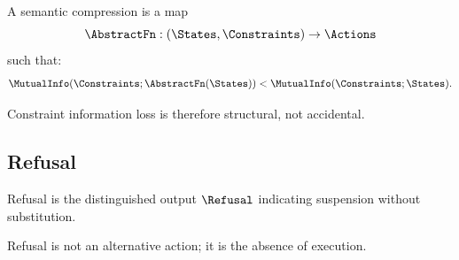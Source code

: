 \begin{definition}
A semantic compression is a map
\[
\AbstractFn : (\States, \Constraints) \to \Actions
\]
such that:
\[
\MutualInfo(\Constraints; \AbstractFn(\States)) < \MutualInfo(\Constraints; \States).
\]
\end{definition}

Constraint information loss is therefore structural, not accidental.

\subsection{Refusal}

\begin{definition}[Refusal]
Refusal is the distinguished output $\Refusal$ indicating suspension without substitution.
\end{definition}

Refusal is not an alternative action; it is the absence of execution.

